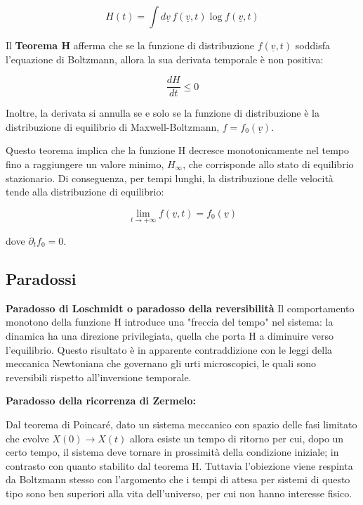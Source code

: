 \begin{equation}
H(t) = \int d\underline{v} \, f(\underline{v}, t) \log f(\underline{v}, t)
\end{equation}

Il \textbf{Teorema H} afferma che se la funzione di distribuzione $f(\underline{v}, t)$ soddisfa l'equazione di Boltzmann, allora la sua derivata temporale è non positiva:

\begin{equation}
\frac{dH}{dt} \le 0
\end{equation}

Inoltre, la derivata si annulla se e solo se la funzione di distribuzione è la distribuzione di equilibrio di Maxwell-Boltzmann, $f = f_0(\underline{v})$.

Questo teorema implica che la funzione H decresce monotonicamente nel tempo fino a raggiungere un valore minimo, $H_\infty$, che corrisponde allo stato di equilibrio stazionario. Di conseguenza, per tempi lunghi, la distribuzione delle velocità tende alla distribuzione di equilibrio:

\begin{equation}
\lim_{t \to +\infty} f(\underline{v}, t) = f_0(\underline{v})
\end{equation}

dove $\partial_t f_0 = 0$.

\subsection{Paradossi}

\textbf{Paradosso di Loschmidt o paradosso della reversibilità}
Il comportamento monotono della funzione H introduce una "freccia del tempo" nel sistema: la dinamica ha una direzione privilegiata, quella che porta H a diminuire verso l'equilibrio. Questo risultato è in apparente contraddizione con le leggi della meccanica Newtoniana che governano gli urti microscopici, le quali sono reversibili rispetto all'inversione temporale. 

\textbf{Paradosso della ricorrenza di Zermelo:}

Dal teorema di Poincaré, dato un sistema meccanico con spazio delle fasi limitato che evolve
$X(0) \rightarrow X(t)$ allora esiste un tempo di ritorno per cui, dopo
un certo tempo, il sistema deve tornare in prossimità della condizione iniziale; in
contrasto con quanto stabilito dal teorema H. Tuttavia l'obiezione viene respinta da Boltzmann
stesso con l'argomento che i tempi di attesa per sistemi di questo tipo sono ben superiori alla
vita dell'universo, per cui non hanno interesse fisico.

